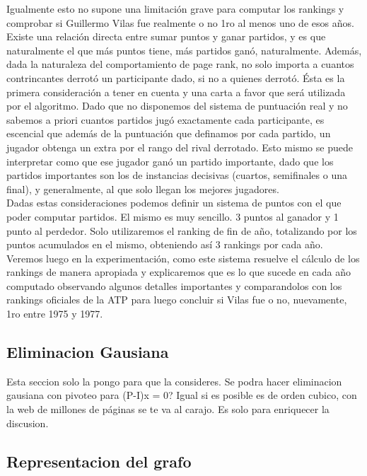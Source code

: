 Igualmente esto no supone una limitación grave para computar los rankings y comprobar si Guillermo Vilas fue realmente o no 1ro al menos uno de esos años.
\\
Existe una relación directa entre sumar puntos y ganar partidos, y es que naturalmente el que más puntos tiene, más partidos ganó, naturalmente.
Además, dada la naturaleza del comportamiento de page rank, no solo importa a cuantos contrincantes derrotó un participante dado, si no a quienes derrotó. Ésta es la primera consideración a tener en cuenta y una carta a favor que será utilizada por el algoritmo. Dado que no disponemos del sistema de puntuación real y no sabemos a priori cuantos partidos jugó exactamente cada participante, es escencial que además de la puntuación que definamos por cada partido, un jugador obtenga un extra por el rango del rival derrotado. Esto mismo se puede interpretar como que ese jugador ganó un partido importante, dado que los partidos importantes son los de instancias decisivas (cuartos, semifinales o una final), y generalmente, al que solo llegan los mejores jugadores.    
\\
Dadas estas consideraciones podemos definir un sistema de puntos con el que poder computar partidos. El mismo es muy sencillo. 3 puntos al ganador y 1 punto al perdedor.
 Solo utilizaremos el ranking de fin de año, totalizando por los puntos acumulados en el mismo, obteniendo así 3 rankings por cada año.
\\
Veremos luego en la experimentación, como este sistema resuelve el cálculo de los rankings de manera apropiada y explicaremos que es lo que sucede en cada año computado observando algunos detalles importantes y comparandolos con los rankings oficiales de la ATP para luego concluir si Vilas fue o no, nuevamente, 1ro entre 1975 y 1977.

\subsection{Eliminacion Gausiana}

Esta seccion solo la pongo para que la consideres. Se podra hacer eliminacion gausiana con pivoteo para (P-I)x = 0? Igual si es posible es de orden cubico, con la web de millones de páginas se te va al carajo. Es solo para enriquecer la discusion.

\subsection{Representacion del grafo}

